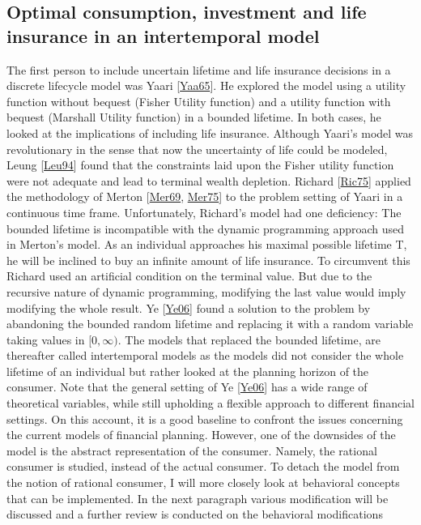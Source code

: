 \documentclass[letterpaper,10pt,english]{jupyterBook}
\begin{document}
\subsection{Optimal consumption, investment and life insurance in an intertemporal model}
\label{\detokenize{Financial_application:optimal-consumption-investment-and-life-insurance-in-an-intertemporal-model}}
\sphinxAtStartPar
The first person to include uncertain lifetime and life insurance decisions in a discrete life\sphinxhyphen{}cycle model was Yaari {[}\hyperlink{cite.Financial_application:id19}{Yaa65}{]}. He explored the model using a utility function without bequest (Fisher Utility function) and a utility function with bequest (Marshall Utility function) in a bounded lifetime. In both cases, he looked at the implications of including life insurance. Although Yaari’s model was revolutionary in the sense that now the uncertainty of life could be modeled, Leung {[}\hyperlink{cite.Financial_application:id23}{Leu94}{]} found that the constraints laid upon the Fisher utility function were not adequate and lead to terminal wealth depletion. Richard {[}\hyperlink{cite.Financial_application:id22}{Ric75}{]} applied the methodology of Merton {[}\hyperlink{cite.Financial_application:id20}{Mer69}, \hyperlink{cite.Financial_application:id21}{Mer75}{]} to the problem setting of Yaari in a continuous time frame. Unfortunately, Richard’s model had one deficiency: The bounded lifetime is incompatible with the dynamic programming approach used in Merton’s model. As an individual approaches his maximal possible lifetime T, he will be inclined to buy an infinite amount of life insurance. To circumvent this Richard used an artificial condition on the terminal value. But due to the recursive nature of dynamic programming, modifying the last value would imply modifying the whole result. Ye {[}\hyperlink{cite.Financial_application:id25}{Ye06}{]}  found a solution to the problem by abandoning the bounded random lifetime and replacing it with a random variable taking values in \([0,\infty)\). The models that replaced the bounded lifetime, are thereafter called intertemporal models as the models did not consider the whole lifetime of an individual but rather looked at the planning horizon of the consumer.  Note that the general setting of Ye {[}\hyperlink{cite.Financial_application:id25}{Ye06}{]} has a wide range of theoretical variables, while still upholding a flexible approach to different financial settings. On this account, it is a good baseline to confront the issues concerning the current models of financial planning. However, one of the downsides of the model is the abstract representation of the consumer. Namely, the rational consumer is studied, instead of the actual consumer. To detach the model from the notion of rational consumer, I will more closely look at behavioral concepts that can be implemented. In the next paragraph various modification will be discussed and a further review is conducted on the behavioral modifications
\end{document}
